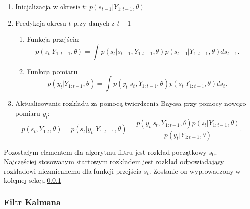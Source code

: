 \begin{algDefinition}[Filtr]
    \begin{enumerate}
        \item Inicjalizacja w okresie $t$: $p(s_{t-1}|Y_{1:t-1}, \theta)$
        \item Predykcja okresu $t$ przy danych z $t-1$
            \begin{enumerate}
                \item Funkcja przejścia:
                    \begin{equation*}
                        p(s_t|Y_{1:t-1}, \theta) = \int p(s_t|s_{t-1}, Y_{1:t-1}, \theta)p(s_{t-1}|Y_{1:t-1},\theta)ds_{t-1}.
                    \end{equation*}
                \item Funkcja pomiaru:
                    \begin{equation*}
                        p(y_t|Y_{1:t-1}, \theta) = \int p(y_t|s_t, Y_{1:t-1}, \theta)p(s_t|Y_{1:t-1},\theta)ds_t.
                    \end{equation*}
            \end{enumerate}
        \item Aktualizowanie rozkładu za pomocą twierdzenia Bayesa przy pomocy nowego pomiaru $y_t$:
            \begin{equation*}
                p(s_t, Y_{1:t}, \theta) = p(s_t|y_t, Y_{1:t-1}, \theta) = \frac{p(y_t|s_t, Y_{1:t-1}, \theta)p(s_t|Y_{1:t-1}, \theta)}{p(y_t|Y_{1:t-1}, \theta)}.
            \end{equation*}
    \end{enumerate}
\end{algDefinition}

Pozostałym elementem dla algorytmu filtru jest rozkład początkowy $s_0$. Najczęściej stosowanym startowym rozkładem jest rozkład odpowiadający rozkładowi niezmiennemu dla funkcji przejścia $s_t$. Zostanie on wyprowadzony w kolejnej sekcji \ref{sec:kalman_filter}.

\subsubsection{Filtr Kalmana}
\label{sec:kalman_filter}

